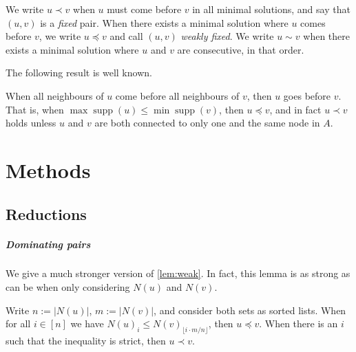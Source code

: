 \documentclass[a4paper,UKenglish,cleveref, autoref, thm-restate]{lipics-v2021}
\renewcommand{\b}{\prec}
\newcommand{\be}{\preceq}
\newcommand{\g}{\sim}
\DeclareMathOperator{\supp}{supp}
\begin{document}
We write $u\b v$ when $u$ must come before $v$ in all minimal solutions, and say that $(u, v)$
is a \emph{fixed} pair. When there exists a minimal solution where $u$ comes before $v$, we
write $u \be v$ and call $(u, v)$ \emph{weakly fixed}.
We write $u\g v$ when there exists a minimal solution where $u$ and $v$ are
consecutive, in that order.

The following result is well known.

\begin{observation}\label{lem:weak}
  When all neighbours of $u$ come before all neighbours of $v$, then $u$ goes before $v$. That
    is, when $\max \supp (u) \leq \min \supp (v)$, then $u\be v$, and in fact $u \b v$ holds
    unless $u$ and $v$ are both connected to only one and the same node in $A$.
\end{observation}

\section{Methods}
\subsection{Reductions}
\subparagraph{Dominating pairs}
We give a much stronger version of \cref{lem:weak}. In fact, this
lemma is as strong as can be when only considering $N(u)$ and $N(v)$.

\begin{lemma}\label{lem:sdp}
  Write $n:= |N(u)|$, $m:=|N(v)|$, and consider both sets as sorted lists.
  When for all $i\in [n]$ we have
  $ N(u)_i \leq N(v)_{\lfloor i\cdot m/n \rfloor} $,
  then $u\be v$.
  When there is an $i$ such that the inequality is strict, then $u\b v$.
\end{lemma}

\end{document}
